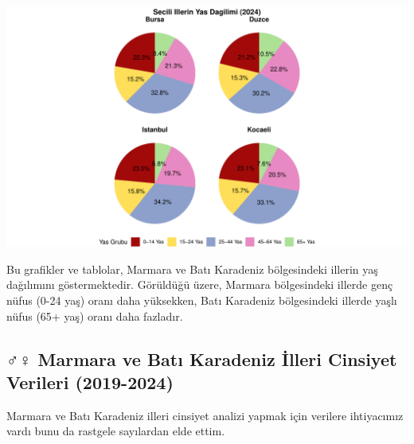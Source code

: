 \documentclass[
]{article}
\begin{document}
\includegraphics{cigdem_ucar_Rmarkdown_odevi_files/figure-latex/secili-iller-pasta-1.pdf}

Bu grafikler ve tablolar, Marmara ve Batı Karadeniz bölgesindeki illerin
yaş dağılımını göstermektedir. Görüldüğü üzere, Marmara bölgesindeki
illerde genç nüfus (0-24 yaş) oranı daha yüksekken, Batı Karadeniz
bölgesindeki illerde yaşlı nüfus (65+ yaş) oranı daha fazladır.

\subsection{♂️♀️ Marmara ve Batı Karadeniz İlleri Cinsiyet Verileri
(2019-2024)}\label{marmara-ve-batux131-karadeniz-illeri-cinsiyet-verileri-2019-2024}

Marmara ve Batı Karadeniz illeri cinsiyet analizi yapmak için verilere
ihtiyacımız vardı bunu da rastgele sayılardan elde ettim.
\end{document}
